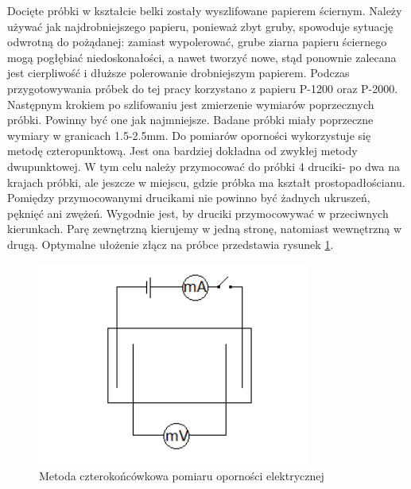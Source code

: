\documentclass[a4paper,12pt]{article}
\numberwithin{equation}{section}
\begin{document}
Docięte próbki w kształcie belki zostały wyszlifowane papierem ściernym. Należy używać jak najdrobniejszego papieru, 
ponieważ zbyt gruby, spowoduje  
sytuację odwrotną do pożądanej: zamiast wypolerować,  grube ziarna papieru ściernego mogą pogłębiać 
niedoskonałości, a nawet tworzyć nowe, stąd ponownie zalecana jest cierpliwość i dłuższe polerowanie 
drobniejszym papierem. Podczas przygotowywania próbek do tej pracy korzystano z papieru P-1200 oraz 
P-2000. Następnym krokiem po szlifowaniu jest zmierzenie wymiarów poprzecznych próbki. Powinny być one jak 
najmniejsze. Badane próbki miały poprzeczne wymiary w granicach 1.5-2.5mm. Do pomiarów oporności 
wykorzystuje się metodę czteropunktową. Jest ona bardziej dokładna od zwykłej metody dwupunktowej. W 
tym celu należy przymocować do próbki 4 druciki- po dwa na krajach próbki, ale jeszcze w miejscu, gdzie 
próbka ma kształt prostopadłościanu. Pomiędzy przymocowanymi drucikami nie powinno być żadnych ukruszeń, 
pęknięć ani zwężeń. Wygodnie jest, by druciki przymocowywać w przeciwnych kierunkach. Parę zewnętrzną 
kierujemy w jedną stronę, natomiast wewnętrzną w drugą. Optymalne ułożenie złącz na próbce przedstawia 
rysunek \ref{img:druciki}.

\begin{figure}[!ht]
    \centering
    \includegraphics[width =0.8\textwidth]{../img/druciki}
    \caption{Metoda czterokońcówkowa pomiaru oporności elektrycznej}
    \label{img:druciki}
\end{figure}
\end{document}
